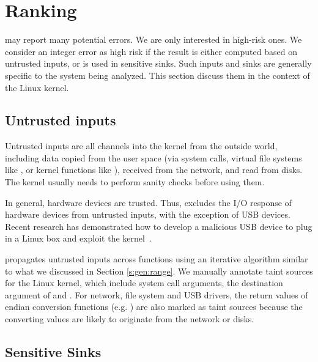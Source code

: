 \section{Ranking}
\label{s:rank}

\sys may report many potential errors.  We are only interested
in high-risk ones.  We consider an integer error as high risk if the
result is either computed based on untrusted inputs, or is used in
sensitive sinks.  Such inputs and sinks are generally specific to
the system being analyzed.  This section discuss them in the context
of the Linux kernel.

\subsection{Untrusted inputs}

Untrusted inputs are all channels into the kernel from the outside world,
including data copied from the user space (via system calls, virtual file
systems like , or kernel functions like ),
received from the network, and read from disks. The kernel usually needs to
perform sanity checks before using them. 

In general, hardware devices are trusted. Thus, \sys excludes the I/O response
of hardware devices from untrusted inputs, with the exception of USB devices.
Recent research has demonstrated how to develop a malicious USB device to plug
in a Linux box and exploit the kernel~\cite{usb:buffer-overflow}.

\sys propagates untrusted inputs across functions using an iterative algorithm
similar to what we discussed in Section \ref{s:gen:range}. We manually annotate
taint sources for the Linux kernel, which include system call arguments, the
destination argument of  and . For network,
file system and USB drivers, the return values of endian conversion functions
(e.g. ) are also marked as taint sources because the
converting values are likely to originate from the network or disks.




\subsection{Sensitive Sinks}

